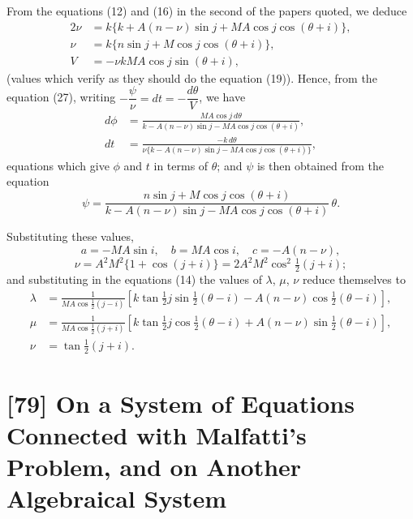 \documentclass[11pt,a4paper]{book}
\begin{document}
From the equations (12) and (16) in the second of the papers quoted, we deduce
\begin{align*}
2\nu &= k\{k + A(n - \nu)\sin j + MA\cos j\cos(\theta + i)\}, \\
\nu &= k\{n\sin j + M\cos j\cos(\theta + i)\}, \\
V &= -\nu kMA\cos j\sin(\theta + i),
\end{align*}
(values which verify as they should do the equation (19)). Hence, from the equation (27), writing $-\dfrac{\psi}{\nu} = dt = -\dfrac{d\theta}{V}$, we have
\begin{align*}
d\phi &= \frac{MA\cos j\,d\theta}{k - A(n - \nu)\sin j - MA\cos j\cos(\theta + i)}, \\
dt &= \frac{-k\,d\theta}{\nu\{k - A(n - \nu)\sin j - MA\cos j\cos(\theta + i)\}},
\end{align*}
equations which give $\phi$ and $t$ in terms of $\theta$; and $\psi$ is then obtained from the equation
\[
\psi = \frac{n\sin j + M\cos j\cos(\theta + i)}{k - A(n - \nu)\sin j - MA\cos j\cos(\theta + i)}\,\theta.
\]

Substituting these values,
\[
a = -MA\sin i, \quad b = MA\cos i, \quad c = -A(n - \nu),
\]
\[
\nu = A^2M^2\{1 + \cos(j + i)\} = 2A^2M^2\cos^2\tfrac{1}{2}(j + i);
\]
and substituting in the equations (14) the values of $\lambda$, $\mu$, $\nu$ reduce themselves to
\begin{align*}
\lambda &= \frac{1}{MA\cos\tfrac{1}{2}(j - i)}\left[k\tan\tfrac{1}{2}j\sin\tfrac{1}{2}(\theta - i) - A(n - \nu)\cos\tfrac{1}{2}(\theta - i)\right], \\
\mu &= \frac{1}{MA\cos\tfrac{1}{2}(j + i)}\left[k\tan\tfrac{1}{2}j\cos\tfrac{1}{2}(\theta - i) + A(n - \nu)\sin\tfrac{1}{2}(\theta - i)\right], \\
\nu &= \tan\tfrac{1}{2}(j + i).
\end{align*}

\newpage
\section*{[79] On a System of Equations Connected with Malfatti's Problem, and on Another Algebraical System}

\bigskip
\end{document}
